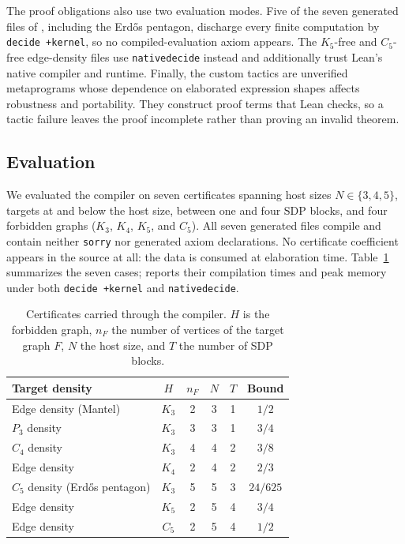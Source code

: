 \documentclass[acmsmall,screen=true,acmthm=false]{acmart}
\DeclareRobustCommand{\lean}[1]{{\def\_{\textunderscore\allowbreak}\texttt{#1}}}
\begin{document}
The proof obligations also use two evaluation modes.  Five of the seven
generated files of , including the Erd\H{o}s pentagon,
discharge every finite computation by \lean{decide +kernel}, so no
compiled-evaluation axiom appears.  The $K_5$-free and $C_5$-free edge-density
files use \lean{native\_decide} instead and additionally trust Lean's native
compiler and runtime.  Finally, the custom
tactics are unverified metaprograms whose dependence on elaborated expression
shapes affects robustness and portability.  They construct proof terms that
Lean checks, so a tactic failure leaves the proof incomplete rather than
proving an invalid theorem.

\subsection{Evaluation}
\label{sec:results}\label{sec:flagmatic-scenarios}

We evaluated the compiler on seven certificates spanning host sizes
$N\in\{3,4,5\}$, targets at and below the host size, between one and four SDP
blocks, and four
forbidden graphs ($K_3$, $K_4$, $K_5$, and $C_5$).  All seven generated files
compile and contain neither \lean{sorry} nor generated axiom declarations.  No
certificate coefficient appears in the source at all: the data is consumed at
elaboration time.
Table~\ref{tab:flagmatic-scenarios} summarizes the seven cases;
 reports their compilation times and peak memory
under both \lean{decide +kernel} and \lean{native\_decide}.

\begin{table}
  \centering
\caption{Certificates carried through the compiler.  \(H\) is the
  forbidden graph, \(n_F\) the number of vertices of the target graph \(F\),
  \(N\) the host size, and \(T\) the number of SDP blocks.}
  \label{tab:flagmatic-scenarios}
  \begin{tabular}{lccccc}
    \toprule
    Target density & $H$ & $n_F$ & $N$ & $T$ & Bound \\
    \midrule
    Edge density (Mantel)               & $K_3$ & 2 & 3 & 1 & $1/2$    \\
    $P_3$ density                       & $K_3$ & 3 & 3 & 1 & $3/4$    \\
    $C_4$ density                       & $K_3$ & 4 & 4 & 2 & $3/8$    \\
    Edge density                        & $K_4$ & 2 & 4 & 2 & $2/3$    \\
    $C_5$ density (Erd\H{o}s pentagon)  & $K_3$ & 5 & 5 & 3 & $24/625$ \\
    Edge density                        & $K_5$ & 2 & 5 & 4 & $3/4$    \\
    Edge density                        & $C_5$ & 2 & 5 & 4 & $1/2$    \\
    \bottomrule
  \end{tabular}
\end{table}
\end{document}
